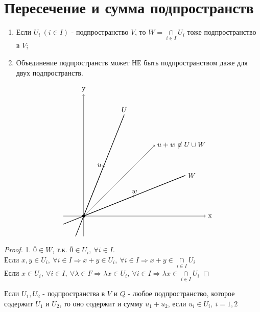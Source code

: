 \section{Пересечение и сумма подпространств}
  \begin{subtheorem}\tab
    \begin{enumerate}
      \item Если $U_i \ (i\in I)$ - подпространство $V$, то $W = \underset{i\in I}{\cap}U_i$ тоже подпространство в $V$;
      \item Объединение подпространств может НЕ быть подпространством даже для двух подпространств.
      
      \[
        \begin{tikzpicture}
          \draw[->] (-1, 0) -- (6, 0) node[right] {x};
          \draw[->] (0, -1) -- (0, 6) node[above] {y};
          \draw[fill] (0, 0) circle (2pt);        
          \draw[thick] (-0.4, -1) -- (2, 5) node[above] {$U$};
          \draw[thick] (-1, -0.4) -- (5, 2) node[right] {$W$};
          \draw[->] (0, 0) -- (1, 2.5) node[left] {$u$};
          \draw[->] (0, 0) -- (2.5, 1) node[above] {$w$};
          \draw[->] (0, 0) -- (3.5, 3.5) node[right] {$u+w\not\in U\cup W$};
      \end{tikzpicture}
      \]

    \end{enumerate}
  \end{subtheorem} 
  \begin{proof}
    1. $\overline{0} \in W$, т.к. $\overline{0} \in U_i, \ \forall i\in I$. \vspace{0.2cm}\\
    Если $x,y \in U_i, \ \forall i\in I \Longrightarrow x+y \in U_i, \ \forall i\in I \Longrightarrow x+y \in \underset{i\in I}{\cap}U_i$ \vspace{0.15cm}\\
    Если $x \in U_i, \ \forall i\in I, \ \forall \lambda \in F \Longrightarrow \lambda x \in U_i, \ \forall i\in I \Longrightarrow \lambda x \in \underset{i\in I}{\cap}U_i$  
  \end{proof}
  \begin{remark}
    Если $U_1, U_2$ - подпространства в $V$ и $Q$ - любое подпространство, которое содержит $U_1$ и $U_2$, то оно содержит и сумму $u_1+u_2$, если $u_i \in U_i, \ i =1,2$       
  \end{remark}
